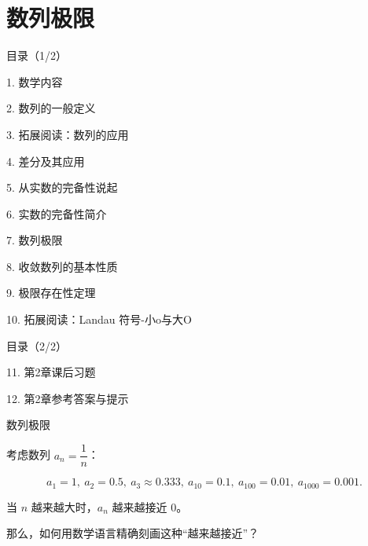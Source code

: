\documentclass[aspectratio=169,10pt,fontset=fandol]{ctexbeamer}
\begin{document}
\section{数列极限}
\begin{frame}[t,fragile]{目录（1/2）}
\normalsize
{\color{black}\normalsize 1. 数学内容\par}\vspace{0.3em}
{\color{black}\normalsize 2. 数列的一般定义\par}\vspace{0.3em}
{\color{black}\normalsize 3. 拓展阅读：数列的应用\par}\vspace{0.3em}
{\color{black}\normalsize 4. 差分及其应用\par}\vspace{0.3em}
{\color{black}\normalsize 5. 从实数的完备性说起\par}\vspace{0.3em}
{\color{black}\normalsize 6. 实数的完备性简介\par}\vspace{0.3em}
{\color{blue}\normalsize 7. 数列极限\par}\vspace{0.3em}
{\color{gray!40}\normalsize 8. 收敛数列的基本性质\par}\vspace{0.3em}
{\color{gray!40}\normalsize 9. 极限存在性定理\par}\vspace{0.3em}
{\color{gray!40}\normalsize 10. 拓展阅读：Landau 符号-小o与大O\par}\vspace{0.3em}
\end{frame}
\begin{frame}[t,fragile]{目录（2/2）}
\normalsize
{\color{gray!40}\normalsize 11. 第2章课后习题\par}\vspace{0.3em}
{\color{gray!40}\normalsize 12. 第2章参考答案与提示\par}\vspace{0.3em}
\end{frame}
\begin{frame}[t,fragile]{数列极限}
\normalsize
{\normalsize




考虑数列 \(a_n = \dfrac{1}{n}\)：

\[

a_1=1,\ a_2=0.5,\ a_3\approx 0.333,\ a_{10}=0.1,\ a_{100}=0.01,\ a_{1000}=0.001.

\]

当 \(n\) 越来越大时，\(a_n\) 越来越接近 0。



那么，如何用数学语言精确刻画这种“越来越接近”？




}
\end{frame}
\end{document}
